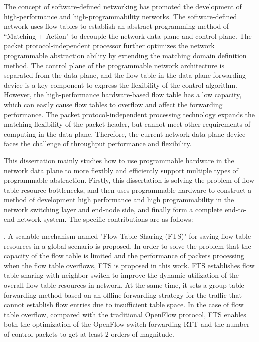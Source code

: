 %
\noindent The concept of software-defined networking has promoted the development of high-performance and high-programmability networks.
The software-defined network uses flow tables to establish an abstract programming method of ``Matching + Action" to decouple the network data plane and control plane.
The packet protocol-independent processor further optimizes the network programmable abstraction ability by extending the matching domain definition method.
The control plane of the programmable network architecture is separated from the data plane, and the flow table in the data plane forwarding device is a key component to express the flexibility of the control algorithm. 
However, the high-performance hardware-based flow table has a low capacity, which can easily cause flow tables to overflow and affect the forwarding performance.
The packet protocol-independent processing technology expands the matching flexibility of the packet header, but cannot meet other requirements of computing in the data plane. 
Therefore, the current network data plane device faces the challenge of throughput performance and flexibility.\newline

\noindent This dissertation mainly studies how to use programmable hardware in the network data plane to more flexibly and efficiently support multiple types of programmable abstraction.
Firstly, this dissertation is solving the problem of flow table resource bottlenecks, and then uses programmable hardware to construct a method of development high performance and high programmability in the network switching layer and end-node side, and finally form a complete end-to-end network system.
The specific contributions are as follows:\newline


. A scalable mechanism named "Flow Table Sharing (FTS)" for saving flow table resources in a global scenario is proposed.
In order to solve the problem that the capacity of the flow table is limited and the performance of packets processing when the flow table overflows, FTS is proposed in this work.
FTS establishes flow table sharing with neighbor switch to improve the dynamic utilization of the overall flow table resources in network. At the same time, it sets a group table forwarding method based on an offline forwarding strategy for the traffic that cannot establish flow entries due to insufficient table space.
In the case of flow table overflow, compared with the traditional OpenFlow protocol, FTS enables both the optimization of the OpenFlow switch forwarding RTT and the number of control packets to get at least 2 orders of magnitude.\newline

